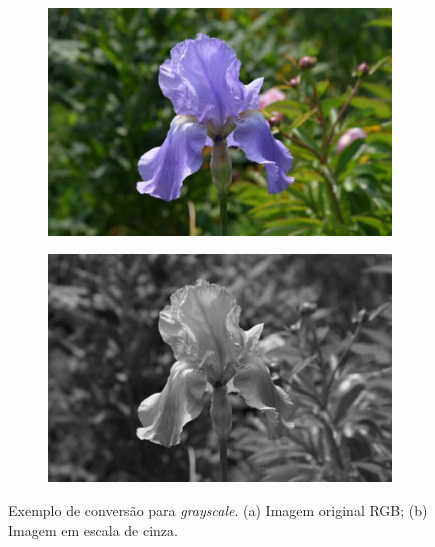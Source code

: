 \begin{figure}[ht]
  \begin{center}
    \begin{subfigure}[b]{.49\textwidth}
      \begin{center}
        \includegraphics[width=.9\linewidth]{imgs/flower.png}
      \end{center}
      \caption{}
      \label{fig:flower_rgb}
    \end{subfigure}
    \begin{subfigure}[b]{.49\textwidth}
      \begin{center}
        \includegraphics[width=.9\linewidth]{imgs/flower_gray.png}
      \end{center}
      \caption{}
      \label{fig:flower_gray}
    \end{subfigure}
  \end{center}
  \caption{Exemplo de conversão para \textit{grayscale}. (a) Imagem original RGB; (b) Imagem em escala de cinza.}
  \label{fig:flowers}
\end{figure}

